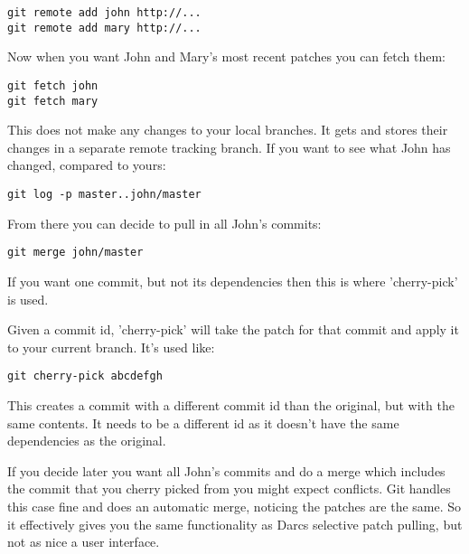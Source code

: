 \begin{verbatim}
git remote add john http://...
git remote add mary http://...
\end{verbatim}

Now when you want John and Mary's most recent patches you can fetch
them:

\begin{verbatim}
git fetch john
git fetch mary
\end{verbatim}

This does not make any changes to your local branches. It gets and
stores their changes in a separate remote tracking branch. If you want
to see what John has changed, compared to yours:

\begin{verbatim}
git log -p master..john/master
\end{verbatim}

From there you can decide to pull in all John's commits:

\begin{verbatim}
git merge john/master
\end{verbatim}

If you want one commit, but not its dependencies then this is where
'cherry-pick' is used.

Given a commit id, 'cherry-pick' will take the patch for that commit
and apply it to your current branch. It's used like:

\begin{verbatim}
git cherry-pick abcdefgh
\end{verbatim}

This creates a commit with a different commit id than the original,
but with the same contents. It needs to be a different id as it
doesn't have the same dependencies as the original.

If you decide later you want all John's commits and do a merge which
includes the commit that you cherry picked from you might expect
conflicts. Git handles this case fine and does an automatic merge,
noticing the patches are the same. So it effectively gives you the
same functionality as Darcs selective patch pulling, but not as nice a
user interface.
